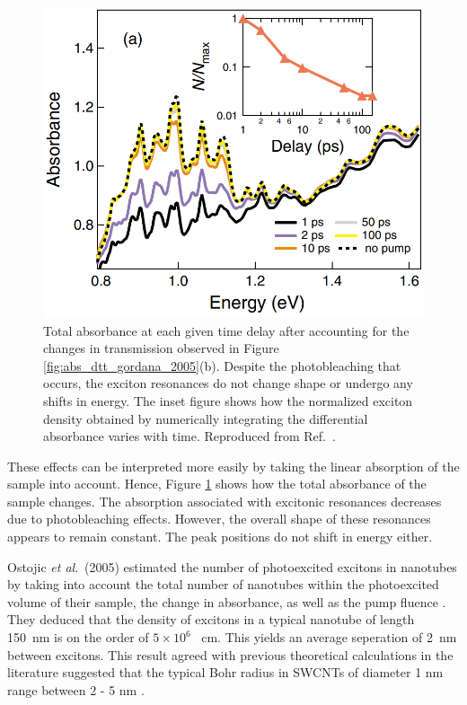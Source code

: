 \begin{figure}[ht]
	\centering
	\includegraphics[scale=1.2]{images/chapter_prior_works/total_abs_gordana_2005}
	\caption{Total absorbance at each given time delay after accounting for the changes in transmission observed in Figure \ref{fig:abs_dtt_gordana_2005}(b). Despite the photobleaching that occurs, the exciton resonances do not change shape or undergo any shifts in energy. The inset figure shows how the normalized exciton density obtained by numerically integrating the differential absorbance varies with time. Reproduced from Ref.\ \cite{ostojic2005stability}.}
	\label{fig:total_abs_gordana_2005}
\end{figure}

These effects can be interpreted more easily by taking the linear absorption of the sample into account. Hence, Figure \ref{fig:total_abs_gordana_2005} shows how the total absorbance of the sample changes. The absorption associated with excitonic resonances decreases due to photobleaching effects. However, the overall shape of these resonances appears to remain constant. The peak positions do not shift in energy either.

Ostojic \textit{et al}.\ (2005) estimated the number of photoexcited excitons in nanotubes by taking into account the total number of nanotubes within the photoexcited volume of their sample, the change in absorbance, as well as the pump fluence \cite{ostojic2005stability}. They deduced that the density of excitons in a typical nanotube of length \SI{150}{\nm} is on the order of $5 \times 10^6$ \si{\per\cm}. This yields an average seperation of \SI{2}{\nm} between excitons. This result agreed with previous theoretical calculations in the literature suggested that the typical Bohr radius in SWCNTs of diameter 1 nm range between 2 - 5 \si{\nm} \cite{spataru2004excitonic, chang2004excitons}.


